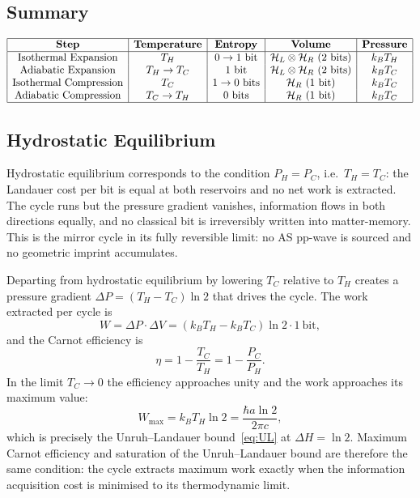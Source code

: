 \documentclass[12pt,a4paper]{article}
\begin{document}
\subsection{Summary}

\begin{equation}
\begin{array}{|c|c|c|c|c|}
\hline
\textbf{Step} & \textbf{Temperature} & \textbf{Entropy} 
& \textbf{Volume} & \textbf{Pressure} \\
\hline
\text{Isothermal Expansion} & T_H & 0 \rightarrow 1\ 
\text{bit} & \mathcal{H}_L \otimes \mathcal{H}_R\ 
(2\ \text{bits}) & k_BT_H \\
\text{Adiabatic Expansion} & T_H \rightarrow T_C & 
1\ \text{bit} & \mathcal{H}_L \otimes \mathcal{H}_R\ 
(2\ \text{bits}) & k_BT_C \\
\text{Isothermal Compression} & T_C & 1 \rightarrow 0\ 
\text{bits} & \mathcal{H}_R\ (1\ \text{bit}) & 
k_BT_C \\
\text{Adiabatic Compression} & T_C \rightarrow T_H & 
0\ \text{bits} & \mathcal{H}_R\ (1\ \text{bit}) & 
k_BT_C \\
\hline
\end{array}
\end{equation}


\subsection{Hydrostatic Equilibrium}

Hydrostatic equilibrium corresponds to the condition 
$P_H = P_C$, i.e.\ $T_H = T_C$: the Landauer cost per 
bit is equal at both reservoirs and no net work is 
extracted. The cycle runs but the pressure gradient 
vanishes, information flows in both directions equally, 
and no classical bit is irreversibly written into 
matter-memory. This is the mirror cycle in its fully 
reversible limit: no AS pp-wave is sourced and no 
geometric imprint accumulates.

Departing from hydrostatic equilibrium by lowering $T_C$ 
relative to $T_H$ creates a pressure gradient 
$\Delta P = (T_H - T_C)\ln 2$ that drives the cycle. 
The work extracted per cycle is
%
\begin{equation}
W = \Delta P \cdot \Delta V 
  = (k_BT_H - k_BT_C)\ln 2 \cdot 1\ \text{bit},
\end{equation}
%
and the Carnot efficiency is
%
\begin{equation}
\eta = 1 - \frac{T_C}{T_H} = 1 - \frac{P_C}{P_H}.
\end{equation}
%
In the limit $T_C \to 0$ the efficiency approaches unity 
and the work approaches its maximum value:
%
\begin{equation}
W_{\max} = k_BT_H\ln 2 = \frac{\hbar a\ln 2}{2\pi c},
\label{eq:Wmax}
\end{equation}
%
which is precisely the Unruh--Landauer bound~\eqref{eq:UL} 
at $\Delta H = \ln 2$. Maximum Carnot efficiency and 
saturation of the Unruh--Landauer bound are therefore the 
same condition: the cycle extracts maximum work exactly 
when the information acquisition cost is minimised to its 
thermodynamic limit. 
\end{document}
